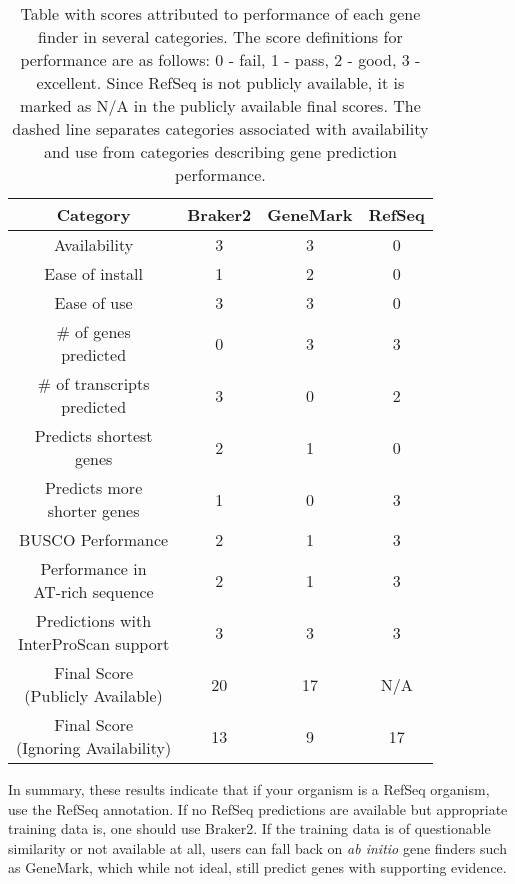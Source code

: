 \begin{table}
  \centering
  \begin{tabular}{|c|c|c|c|}
    \hline
    Category & Braker2 & GeneMark & RefSeq \\ \hline
    Availability & 3 & 3 & 0 \\ \hline
    Ease of install & 1 & 2 & 0 \\ \hline
    Ease of use & 3 & 3 & 0 \\ \hdashline
    \makecell{\# of genes\\predicted} & 0 & 3 & 3 \\ \hline
    \makecell{\# of transcripts\\predicted} & 3 & 0 & 2 \\ \hline
    \makecell{Predicts shortest\\genes} & 2 & 1 & 0 \\ \hline
    \makecell{Predicts more\\shorter genes} & 1 & 0 & 3 \\ \hline
    BUSCO Performance & 2 & 1 & 3 \\ \hline
    \makecell{Performance in\\AT-rich sequence} & 2 & 1 & 3 \\ \hline
    \makecell{Predictions with \\InterProScan support} & 3 & 3 & 3 \\ \hline
    \makecell{Final Score\\(Publicly Available)} & 20 & 17 & N/A \\ \hline
    \makecell{Final Score\\(Ignoring Availability)} & 13 & 9 & 17 \\ \hline
  \end{tabular}
  \caption[Final scoring table]{Table with scores attributed to
    performance of each gene finder in several categories. The score
    definitions for performance are as follows: 0 - fail, 1 - pass, 2
    - good, 3 - excellent. Since RefSeq is not publicly available, it is
    marked as N/A in the publicly available final scores. The dashed
    line separates categories associated with availability and use
    from categories describing gene prediction performance.}
  \label{table:final-score}
\end{table}

In summary, these results indicate that if your organism is a RefSeq
organism, use the RefSeq annotation. If no RefSeq predictions are
available but appropriate training data is, one should use Braker2. If
the training data is of questionable similarity or not available at
all, users can fall back on \textit{ab initio} gene finders such as
GeneMark, which while not ideal, still predict genes with supporting
evidence.

